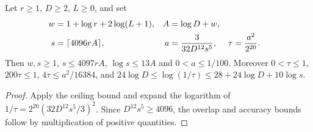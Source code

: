 \begin{lemma}
    \label{lem:interleaved_sample_accuracy}
    \leanok
    Let $r\ge1$, $D\ge2$, $L\ge0$, and set
    \begin{align}
        w & =1+\log r+2\log(L+1),   & A    & =\log D+w,\notag     \\
        s & =\lceil4096rA\rceil,    &
        a & =\frac{3}{32D^{12}s^5}, & \tau & =\frac{a^2}{2^{20}}.
        \label{eq:interleaved_sample_accuracy}
    \end{align}
    Then $w,s\ge1$, $s\le4097rA$, $\log s\le13A$ and $0<a\le1/100$.
    Moreover $0<\tau\le1$, $200\tau\le1$, $4\tau\le a^2/16384$, and
    $24\log D\le\log(1/\tau)\le28+24\log D+10\log s$.
\end{lemma}
\begin{proof}\leanok
    Apply the ceiling bound and expand the logarithm of
    $1/\tau=2^{20}(32D^{12}s^5/3)^2$. Since $D^{12}s^5\ge4096$,
    the overlap and accuracy bounds follow by multiplication of positive quantities.
\end{proof}

